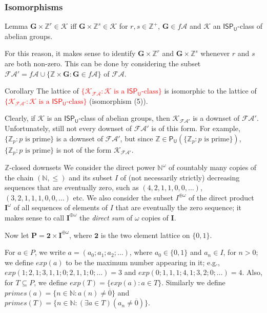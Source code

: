\documentclass[professionalfont, handout, 10pt]{beamer} %
\theoremstyle{plain}
\theoremstyle{definition}
\newcommand{\m}[1]{{\mathbf {#1} }}
\newcommand{\bb}[1]{\mathbb {#1}}
\begin{document}
\begin{frame}
\frametitle{Isomorphisms}
    \begin{block}{Lemma}
        $\m G \times \mathbb{Z}^r \in \mathcal{K}$ iff $\m G \times \mathbb{Z}^s \in \mathcal{K}$ for $r, s \in \bb{Z}^+$, $\m G \in f\mathcal{A}$ and $\mathcal{K}$ an $\mathsf{ISP_U}$-class of abelian groups.
    \end{block}
    \pause
    For this reason, it makes sense to identify $\m G \times \mathbb{Z}^r$ and $\m G \times \mathbb{Z}^s$ whenever $r$ and $s$ are both non-zero.
    This can be done by considering the subset $\mathcal{FA}' = f\mathcal{A} \cup \{\bb{Z} \times \m G: \m G \in f\mathcal{A}\}$ of $\mathcal{FA}$.
    \pause
    \begin{block}{Corollary}
        The lattice of \textcolor{red}{$\{\mathcal{K}_{\mathcal{FA}}: \mathcal{K} \text{ is a } \mathsf{ISP_U} \text{-class}\}$} is isomorphic to the lattice of \textcolor{red}{$\{\mathcal{K}_{\mathcal{FA}'}: \mathcal{K} \text{ is a } \mathsf{ISP_U} \text{-class}\}$} (isomorphism (5)).
    \end{block}
    \pause
    Clearly, if $\mathcal{K}$ is an $\mathsf{ISP_U}$-class of abelian groups, then $\mathcal{K}_{\mathcal{FA}'}$ is a downset of $\mathcal{FA}'$.
    Unfortunately, still not every downset of $\mathcal{FA}'$ is of this form.
    For example, $\{\bb{Z}_p: p \text{ is prime}\}$ is a downset of $\mathcal{FA}'$, but since $\bb{Z} \in \mathsf{P_U}(\{\bb{Z}_p: p \text{ is prime}\})$, $\{\bb{Z}_p: p \text{ is prime}\}$ is not of the form $\mathcal{K}_{\mathcal{FA}'}$.
\end{frame}

\begin{frame}{$\bb{Z}$-closed downsets}
    We consider the direct power $\bb{N}^\omega$ of countably many copies of the chain $(\mathbb{N}, \leq)$ and its subset $I$ of (not necessarily strictly) decreasing sequences that are eventually zero, such as $(4, 2, 1, 1, 0, 0, \dots)$, $(3, 2, 1, 1, 1, 0, 0, \dots)$ etc.
    We also consider the subset $I^{\oplus \omega}$ of the direct product $\m I^\omega$ of all sequences of elements of $I$ that are eventually the zero sequence; it makes sense to call $\m{I}^{\oplus \omega}$ the \emph{direct sum} of $\omega$ copies of $\m I$.\pause
    
    Now let $\m{P} = \m 2 \times \m I^{\oplus \omega}$, where $\m 2$ is the two element lattice on $\{0,1\}$.\pause
    
    For $a \in P$, we write $a=(a_0; a_1; a_2; \ldots)$, where $a_0 \in \{0, 1\}$ and $a_n \in I$, for $n>0$; we define $exp(a)$ to be the maximum number appearing in it; e.g., $exp(1; 2, 1; 3, 1, 1; 0; 2, 1, 1; 0; \dots)=3$ and $exp(0; 1, 1, 1; 4, 1; 3, 2; 0; \dots)=4$.
    Also, for $T \subseteq P$, we define $exp(T) =\{exp(a): a \in T\}$.
    Similarly we define $primes(a) = \{n \in \bb{N}: a(n) \neq \overline{0}\}$ and $primes(T) = \{n \in \bb{N}: (\exists a \in T)(a_n \neq \overline{0})\}$.
\end{frame}
\end{document}
